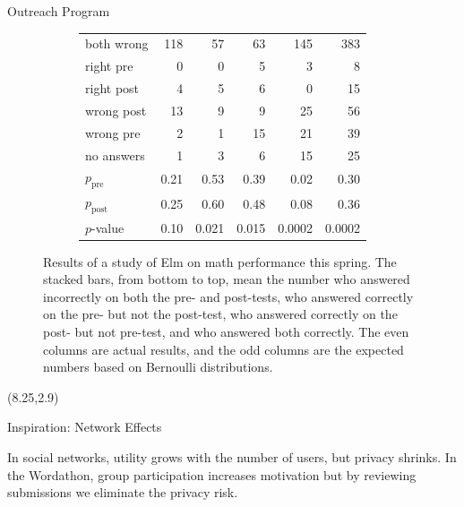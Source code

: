 \documentclass[22pt]{beamer}
\begin{document}
\begin{frame}[fragile]
\begin{textblock}{7.25}
\begin{block}{Outreach Program}
\begin{figure}
\begin{subfigure}{0.50\textwidth}
\begin{tabular}{lrrrrr}
both wrong	& 118	& 57	& 63	& 145	& 383\\
right pre	& 0	& 0	& 5	& 3	& 8\\
right post	& 4	& 5	& 6	& 0	& 15\\
wrong post	& 13	& 9	& 9	& 25	& 56\\
wrong pre	& 2	& 1	& 15	& 21	& 39\\
no answers	& 1	& 3	& 6	& 15	& 25\\
\hline
$p_\text{pre}$ & 0.21	& 0.53	& 0.39	& 0.02 & 0.30\\
$p_\text{post}$ & 0.25	& 0.60	& 0.48	& 0.08 & 0.36\\
\hline
$p$-value & 0.10 & 0.021 & 0.015 & 0.0002 & 0.0002
\end{tabular}
\end{subfigure}
\caption{Results of a study of Elm on math performance this spring. The stacked bars, from bottom to top, mean the number who answered incorrectly on both the pre- and post-tests,
who answered correctly on the pre- but not the post-test, who answered correctly on the post- but not pre-test, and who answered both correctly.
The even columns are actual results, and the odd columns are the expected numbers based on Bernoulli distributions. \label{barchart}}
\end{figure}
\vspace{-1em}
\end{block}
\end{textblock}



\begin{textblock}{7.25}(8.25,2.9)
\begin{block}{Inspiration: Network Effects}
\vspace{0.3cm}
\noindent\parbox[][][t]{0.54\textwidth}{
}
\parbox[][][t]{0.45\textwidth}{
In social networks, utility grows with the number of users, but privacy shrinks. In the Wordathon, group participation increases motivation but by reviewing submissions we eliminate the privacy risk.
}
\end{block}



\end{textblock}
\end{frame}
\end{document}
